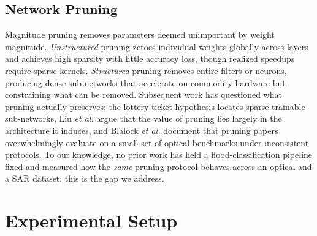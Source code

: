 \documentclass[conference]{IEEEtran}
\newif\ifreview
\newcommand{\REV}[1]{\ifreview\textcolor{red}{\textbf{[Revise: #1]}}\fi}
\begin{document}
\subsection{Network Pruning}
Magnitude pruning removes parameters deemed unimportant by weight
magnitude. \emph{Unstructured} pruning \cite{han2015learning} zeroes
individual weights globally across layers and achieves high sparsity
with little accuracy loss, though realized speedups require sparse
kernels. \emph{Structured} pruning \cite{li2017pruning} removes entire
filters or neurons, producing dense sub-networks that accelerate on
commodity hardware but constraining what can be removed. Subsequent
work has questioned what pruning actually preserves: the lottery-ticket
hypothesis \cite{frankle2019lottery} locates sparse trainable
sub-networks, Liu \emph{et al.} \cite{liu2019rethinking} argue that
the value of pruning lies largely in the architecture it induces, and
Blalock \emph{et al.} \cite{blalock2020state} document that pruning
papers overwhelmingly evaluate on a small set of optical benchmarks
under inconsistent protocols. To our knowledge, no prior work has held
a flood-classification pipeline fixed and measured how the \emph{same}
pruning protocol behaves across an optical and a SAR dataset; this is
the gap we address.
\REV{[A8] (i) The novelty sentence (``To our knowledge, no prior
work\ldots'') must be backed by an actual literature search; do it
and cite the closest works (pruning on remote sensing / SAR). (ii) Add
a sentence on \emph{who} suffers from pruning: Hooker et al.\ 2019
show compression disproportionately hurts certain classes/examples --
directly relevant to our minority-class (FloodNet) vs.\
majority-class (SAR) discussion. (iii) Cut this subsection by $\sim$20\%
to pay for the new figures/tables.}

\section{Experimental Setup}
\label{sec:setup}
\end{document}
